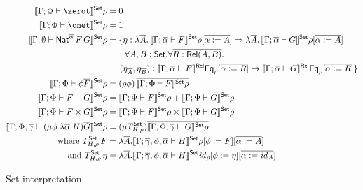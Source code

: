 \documentclass[runningheads]{llncs}
\newcommand{\set}{\mathsf{Set}}
\renewcommand{\id}{\mathit{id}}
\renewcommand{\id}{\mathit{id}}
\begin{document}
\begin{figure}[t]
  \begin{adjustbox}{varwidth=5in, max width=5in, fbox, center}
  \begin{align*}
  \setsem{\Gamma;\Phi \vdash \zerot}\rho &= 0\\
  \setsem{\Gamma;\Phi \vdash \onet}\rho &= 1\\
  \setsem{\Gamma; \emptyset
    \vdash \Nat^{\ol{\alpha}}
    \,F\,G}\rho &= \{\eta : \lambda \ol{A}. \,\setsem{\Gamma;
    \ol{\alpha} \vdash
    F}\rho[\ol{\alpha := A}] 
      \Rightarrow \lambda \ol{A}.\,\setsem{\Gamma; 
        \ol{\alpha} \vdash G}\rho[\ol{\alpha := A}] \\ 
      &\hspace{0.2in}|~\forall \overline{A}, \overline{B} :
      \set. \forall \overline{R : \rel(A, B)}.\\ 
      &\hspace{0.2in}(\eta_{\overline{A}}, \eta_{\overline{B}})
      : \relsem{\Gamma; \ol{\alpha} \vdash F}\Eq_{\rho}[\ol{\alpha := R}]
      \rightarrow \relsem{\Gamma; \ol{\alpha} \vdash
        G}\Eq_{\rho}[\ol{\alpha := R}] \} \\
  \setsem{\Gamma;\Phi \vdash \phi\ol{F}}\rho &=
  (\rho\phi)\,\ol{\setsem{\Gamma;\Phi \vdash
    F}\rho}\\
  \setsem{\Gamma;\Phi \vdash F+G}\rho &=
  \setsem{\Gamma;\Phi \vdash F}\rho +
  \setsem{\Gamma;\Phi \vdash G}\rho\\
  \setsem{\Gamma;\Phi \vdash F\times G}\rho &=
  \setsem{\Gamma;\Phi \vdash F}\rho \times
  \setsem{\Gamma;\Phi \vdash G}\rho\\ 
  \setsem{\Gamma;\Phi,\ol\gamma \vdash (\mu \phi.\lambda
    \ol{\alpha}. H)\ol{G}}\rho &= (\mu
    T^\set_{H,\rho})\ol{\setsem{\Gamma;\Phi,\ol\gamma \vdash G}\rho}\\
    \text{where } T^\set_{H,\rho}\,F & = \lambda
  \ol{A}. \setsem{\Gamma;\ol\gamma,\phi, \ol{\alpha} \vdash
    H}\rho[\phi :=  F][\ol{\alpha := A}]\\
  \text{and } T^\set_{H,\rho}\,\eta &= \lambda
  \ol{A}. \setsem{\Gamma;\ol\gamma,\phi, \ol{\alpha} \vdash
    H}\id_\rho[\phi := \eta][\ol{\alpha := \id_{A}}]
\end{align*}
\vspace*{-0.3in}\caption{Set interpretation}\label{fig:set-sem} 
\vspace*{-0.3in}
\end{adjustbox}\vspace*{-0.17in}
  \end{figure}
\end{document}

